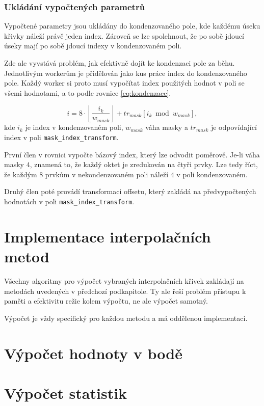 \documentclass[]{thesiskiv}
\begin{document}
\subsubsection*{Ukládání vypočtených parametrů}

Vypočtené parametry jsou ukládány do kondenzovaného pole, kde každému úseku křivky náleží právě jeden index. Zároveň se lze spolehnout, že po sobě jdoucí úseky mají po sobě jdoucí indexy v kondenzovaném poli.

Zde ale vyvstává problém, jak efektivně dojít ke kondenzaci pole za běhu. Jednotlivým workerům je přidělován jako kus práce index do kondenzovaného pole. Každý worker si proto musí vypočítat index použitých hodnot v poli se všemi hodnotami, a to podle rovnice \ref{eq:kondenzace}.

\begin{equation}\label{eq:kondenzace}
i = 8 \cdot\left\lfloor\frac{i_{k}}{w_{mask}}\right\rfloor + tr_{mask}[i_{k} \bmod w_{mask}],
\end{equation}
kde $i_{k}$ je index v kondenzovaném poli, $w_{mask}$ váha masky a $tr_{mask}$ je odpovídající index v poli \texttt{mask\_index\_transform}.

První člen v rovnici vypočte bázový index, který lze odvodit poměrově. Je-li váha masky $4$, znamená to, že každý oktet je zredukován na čtyři prvky. Lze tedy říct, že každým $8$ prvkům v nekondenzovaném poli náleží $4$ v poli kondenzovaném.

Druhý člen poté provádí transformaci offsetu, který zakládá na předvypočtených hodnotách v poli \texttt{mask\_index\_transform}.

\section{Implementace interpolačních metod}

Všechny algoritmy pro výpočet vybraných interpolačních křivek zakládají na metodách uvedených v předchozí podkapitole. Ty ale řeší problém přístupu k paměti a efektivitu režie kolem výpočtu, ne ale výpočet samotný.

Výpočet je vždy specifický pro každou metodu a má oddělenou implementaci.




\section{Výpočet hodnoty v bodě}

\section{Výpočet statistik}
\end{document}
